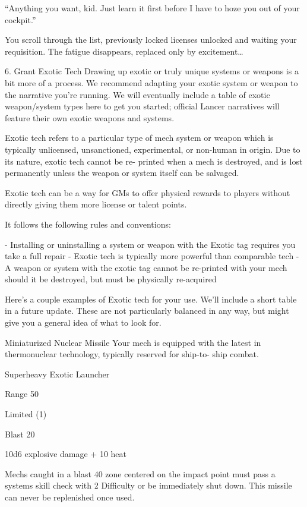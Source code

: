 ``Anything you want, kid. Just learn it first before I have to hoze you out of your cockpit.''




You scroll through the list, previously locked licenses unlocked and waiting your requisition. The
fatigue disappears, replaced only by excitement…

6. Grant Exotic Tech
Drawing up exotic or truly unique systems or weapons is a bit more of a process. We
recommend adapting your exotic system or weapon to the narrative you’re running. We will
eventually include a table of exotic weapon/system types here to get you started; official Lancer
narratives will feature their own exotic weapons and systems.


Exotic tech refers to a particular type of mech system or weapon which is typically unlicensed,
unsanctioned, experimental, or non-human in origin. Due to its nature, exotic tech cannot be re-
printed when a mech is destroyed, and is lost permanently unless the weapon or system itself
can be salvaged.


Exotic tech can be a way for GMs to offer physical rewards to players without directly giving
them more license or talent points.


 It follows the following rules and conventions:

    -    Installing or uninstalling a system or weapon with the Exotic tag requires you take a full
         repair
    -    Exotic tech is typically more powerful than comparable tech
    -    A weapon or system with the exotic tag cannot be re-printed with your mech should it
         be destroyed, but must be physically re-acquired

Here’s a couple examples of Exotic tech for your use. We’ll include a short table in a future
update. These are not particularly balanced in any way, but might give you a general idea of what
to look for.


Miniaturized Nuclear Missile
Your mech is equipped with the latest in thermonuclear technology, typically reserved for ship-to-
ship combat.

Superheavy Exotic Launcher

Range 50

Limited (1)

Blast 20

10d6 explosive damage + 10 heat


Mechs caught in a blast 40 zone centered on the impact point must pass a systems skill check
with 2 Difficulty or be immediately shut down. This missile can never be replenished once used.


